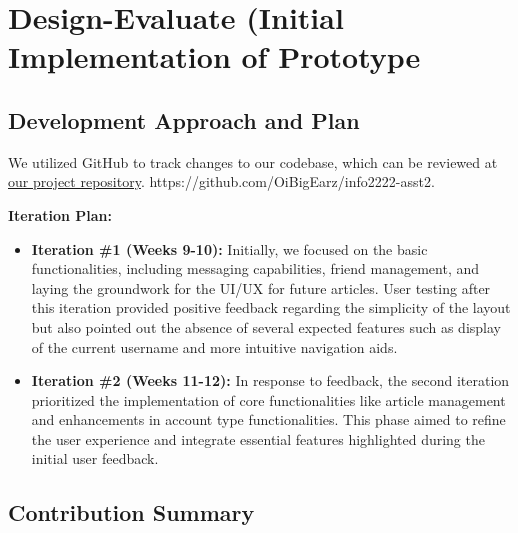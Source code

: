 \documentclass[12pt,a4paper]{article}
\begin{document}
\section{Design-Evaluate (Initial Implementation of Prototype}

\subsection*{Development Approach and Plan}
We utilized GitHub to track changes to our codebase, which can be reviewed at \href{https://github.com/OiBigEarz/info2222-asst2}{our project repository}. https://github.com/OiBigEarz/info2222-asst2. 

\textbf{Iteration Plan:}
\begin{itemize}
    \item \textbf{Iteration \#1 (Weeks 9-10):} Initially, we focused on the basic functionalities, including messaging capabilities, friend management, and laying the groundwork for the UI/UX for future articles. User testing after this iteration provided positive feedback regarding the simplicity of the layout but also pointed out the absence of several expected features such as display of the current username and more intuitive navigation aids.
    \item \textbf{Iteration \#2 (Weeks 11-12):} In response to feedback, the second iteration prioritized the implementation of core functionalities like article management and enhancements in account type functionalities. This phase aimed to refine the user experience and integrate essential features highlighted during the initial user feedback.
\end{itemize}

\subsection*{Contribution Summary}
\end{document}
